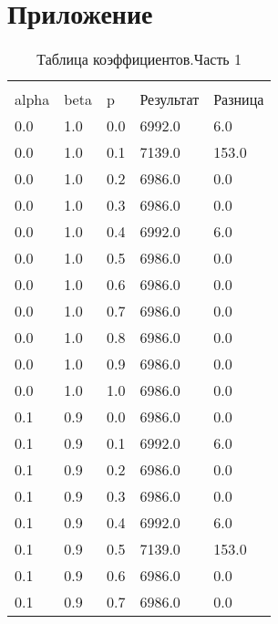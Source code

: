 
\chapter*{Приложение}\label{exit}


\begin{longtable}{ l | l | l | l | l}
    \caption{Таблица коэффициентов.Часть 1}\\
    \label{label}\\
    alpha&         beta&            p&    Результат&      Разница \\ \hline
      0.0&          1.0&          0.0&       6992.0&          6.0\\
      0.0&          1.0&          0.1&       7139.0&        153.0\\
      0.0&          1.0&          0.2&       6986.0&          0.0\\
      0.0&          1.0&          0.3&       6986.0&          0.0\\
      0.0&          1.0&          0.4&       6992.0&          6.0\\
      0.0&          1.0&          0.5&       6986.0&          0.0\\
      0.0&          1.0&          0.6&       6986.0&          0.0\\
      0.0&          1.0&          0.7&       6986.0&          0.0\\
      0.0&          1.0&          0.8&       6986.0&          0.0\\
      0.0&          1.0&          0.9&       6986.0&          0.0\\
      0.0&          1.0&          1.0&       6986.0&          0.0\\
      0.1&          0.9&          0.0&       6986.0&          0.0\\
      0.1&          0.9&          0.1&       6992.0&          6.0\\
      0.1&          0.9&          0.2&       6986.0&          0.0\\
      0.1&          0.9&          0.3&       6986.0&          0.0\\
      0.1&          0.9&          0.4&       6992.0&          6.0\\
      0.1&          0.9&          0.5&       7139.0&        153.0\\
      0.1&          0.9&          0.6&       6986.0&          0.0\\
      0.1&          0.9&          0.7&       6986.0&          0.0\\

\end{longtable}
